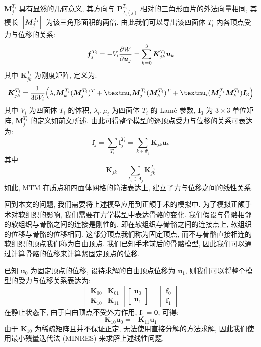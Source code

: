 $\bm{M}_j^{T_i}$ 具有显然的几何意义, 其方向与 $\bm{P}_{T_i(j)}^{T_i}$ 相对的三角形面片的外法向量相同, 其模长 $\norm{\bm{M}_j^{T_i}}$ 为该三角形面积的两倍.
由此我们可以导出该四面体 $T_i$ 内各顶点受力与位移的关系:
\begin{equation}
  \bm{f}_j^{T_i}
  = - V_i \pdv{W}{\bm{u}_j}
  = \sum_{k = 0}^3 \bm{K}_{jk}^{T_i} \bm{u}_k
\end{equation}
其中 $\bm{K}_{jk}^{T_i}$ 为刚度矩阵, 定义为:
\begin{equation}
  \bm{K}_{jk}^{T_i} = \frac{1}{36 V_i} \pqty{\lambda_i \bm{M}_k^{T_i} (\bm{M}_j^{T_i})^T + \mu_i \bm{M}_j^{T_i} (\bm{M}_k^{T_i})^T + \mu_i (\bm{M}_j^{T_i} \bm{M}_k^{T_i}) \bm{I}_3}
\end{equation}
其中 $V_i$ 为四面体 $T_i$ 的体积, $\lambda_i, \mu_i$ 为四面体 $T_i$ 的 Lam\`e 参数, $\bm{I}_3$ 为 $3 \times 3$ 单位矩阵, $\bm{M}_j^{T_i}$ 的定义如前文所述.
由此可得整个模型的逐顶点受力与位移的关系可表达为:
\begin{equation}
  \bm{f}_j
  = \sum_{T_i} \bm{f}_j^{T_i}
  = \sum_{k \in \Psi_j} \bm{K}_{jk} \bm{u}_k
\end{equation}
其中
\begin{equation}
  \bm{K}_{jk} = \sum_{T_i \in \Lambda_j} \bm{K}_{jk}^{T_i}
\end{equation}
如此, MTM 在质点和四面体网格的简洁表达上, 建立了力与位移之间的线性关系.

回到本文的问题, 我们需要将上述模型应用到正颌手术的模拟中.
为了模拟正颌手术对软组织的影响, 我们需要在力学模型中表达骨骼的变化.
我们假设与骨骼相邻的软组织与骨骼之间的连接是刚性的, 即在软组织与骨骼之间的连接点上, 软组织的位移与骨骼的位移相同.
这部分顶点我们称为固定顶点, 而不与骨骼直接相连的软组织的顶点我们称为自由顶点.
我们已知手术前后的骨骼模型, 因此我们可以通过计算骨骼的位移来计算紧固定顶点的位移.

已知 $\bm{u}_0$ 为固定顶点的位移, 设待求解的自由顶点位移为 $\bm{u}_1$, 则我们可以将整个模型的受力与位移关系表达为:
\begin{equation}
  \begin{bmatrix}
    \bm{K}_{00} & \bm{K}_{01} \\
    \bm{K}_{10} & \bm{K}_{11}
  \end{bmatrix}
  \begin{bmatrix}
    \bm{u}_0 \\
    \bm{u}_1
  \end{bmatrix}
  =
  \begin{bmatrix}
    \bm{f}_0 \\
    \bm{f}_1
  \end{bmatrix}
\end{equation}
在静止状态下, 由于自由顶点不受外力作用, $\bm{f}_1 = \bm{0}$, 可得:
\begin{equation}
  \bm{K}_{10} \bm{u}_0 = - \bm{K}_{11} \bm{u}_1
\end{equation}
由于 $\bm{K}_{10}$ 为稀疏矩阵且并不保证正定, 无法使用直接分解的方法求解, 因此我们使用最小残量迭代法 (MINRES) 来求解上述线性问题.
